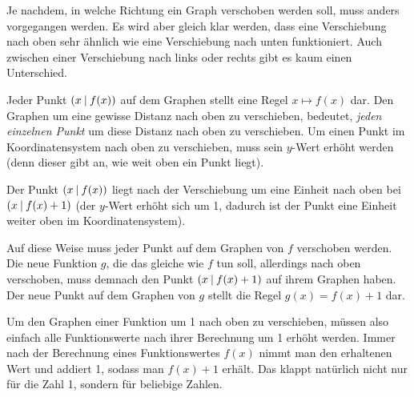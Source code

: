 \documentclass[../../main.tex]{subfiles}
\begin{document}
Je nachdem, in welche Richtung ein Graph verschoben werden soll, muss anders vorgegangen werden. Es wird aber gleich klar werden, dass eine Verschiebung nach oben sehr ähnlich wie eine Verschiebung nach unten funktioniert. Auch zwischen einer Verschiebung nach links oder rechts gibt es kaum einen Unterschied.

Jeder Punkt $\left(x \:\middle|\: f(x)\right)$ auf dem Graphen stellt eine Regel $x\mapsto f(x)$ dar. Den Graphen um eine gewisse Distanz nach oben zu verschieben, bedeutet, \emph{jeden einzelnen Punkt} um diese Distanz nach oben zu verschieben. Um einen Punkt im Koordinatensystem nach oben zu verschieben, muss sein $y$-Wert erhöht werden (denn dieser gibt an, wie weit oben ein Punkt liegt).


Der Punkt $\left(x \:\middle|\: f(x)\right)$ liegt nach der Verschiebung um eine Einheit nach oben bei $\left(x \:\middle|\: f(x)+1\right)$ (der $y$-Wert erhöht sich um 1, dadurch ist der Punkt eine Einheit weiter oben im Koordinatensystem).

Auf diese Weise muss jeder Punkt auf dem Graphen von $f$ verschoben werden. Die neue Funktion $g$, die das gleiche wie $f$ tun soll, allerdings nach oben verschoben, muss demnach den Punkt $\left(x \:\middle|\: f(x)+1\right)$ auf ihrem Graphen haben. Der neue Punkt auf dem Graphen von $g$ stellt die Regel $g(x)=f(x)+1$ dar.

Um den Graphen einer Funktion um 1 nach oben zu verschieben, müssen also einfach alle Funktionswerte nach ihrer Berechnung um 1 erhöht werden. Immer nach der Berechnung eines Funktionswertes $f(x)$ nimmt man den erhaltenen Wert und addiert 1, sodass man $f(x)+1$ erhält. Das klappt natürlich nicht nur für die Zahl 1, sondern für beliebige Zahlen.
\end{document}

